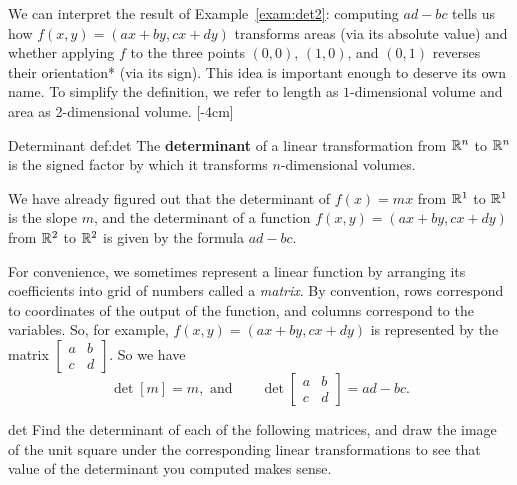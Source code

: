 \documentclass{watsonbook}
\begin{document}
We can interpret the result of Example~\ref{exam:det2}: computing
$ad - bc$ tells us how $f(x,y) = (ax + by, cx + dy)$ transforms areas
(via its absolute value) and whether applying $f$ to the three points
$(0,0)$, $(1,0)$, and $(0,1)$ reverses their orientation* (via its
sign). This idea is important enough to deserve its own name. To
simplify the definition, we refer to length as $1$-dimensional volume
and area as 2-dimensional volume. [-4cm]

\begin{defn}{Determinant }{def:det} \bang{-5mm}
  The \textbf{determinant} of a linear transformation from $\mathbb{R}^n$ to
  $\mathbb{R}^n$ is the signed factor by which it transforms $n$-dimensional
  volumes. 
\end{defn}

We have already figured out that the determinant of $f(x) = mx$ from
$\mathbb{R}^1$ to $\mathbb{R}^1$ is the slope $m$, and the determinant of a function
$f(x,y) = (ax + by, cx + dy)$ from $\mathbb{R}^2$ to $\mathbb{R}^2$ is given by the
formula $ad - bc$.

For convenience, we sometimes represent a linear function by arranging
its coefficients into grid of numbers called a \textit{matrix}. By
convention, rows correspond to coordinates of the output of the
function, and columns correspond to the variables. So, for example,
$f(x,y) = (ax + by, cx + dy)$ is represented by the matrix
$\left[\begin{array}{cc} a & b \\ c & d \end{array}\right]$. So we
have
\[
\det [m] = m, \text{ and} \qquad \det \left[\begin{array}{cc} a & b \\ c & d \end{array}\right] = ad - bc. 
\]

\begin{exercise}{}{det}
  Find the determinant of each of the following matrices, and draw the image of the unit square under the corresponding linear transformations to see that value of the determinant you computed makes sense. 

\pairofprobs{$\left[\begin{array}{cc} 1 & 0 \\ 0 & -1 \end{array}\right]$}{
$\left[\begin{array}{cc} 2 & 1 \\ 0 & 2 \end{array}\right]$}

\pairofprobs{$\left[\begin{array}{cc} 0 & 1 \\ -1 & 0 \end{array}\right]$}{
$\left[\begin{array}{cc} 2 & 1  \\ 4 & 2 \end{array}\right]$}
\end{exercise}
\end{document}
